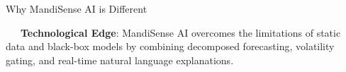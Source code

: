 \documentclass{beamer}
\begin{document}
\begin{frame}{Why MandiSense AI is Different}
\vspace{0.15cm}
\begin{tcolorbox}[enhanced, colback=primaryblue!4, colframe=primaryblue!30, boxrule=0.35pt,
  arc=3.5pt, width=0.98\textwidth, left=4pt, right=4pt, top=2.5pt, bottom=2.5pt, boxsep=0pt,
  halign=center, shadow={0.5pt}{-0.5pt}{0pt}{black!8}]
    \fontsize{5.5pt}{6.5pt}\selectfont
    \textcolor{primaryDark}{~~~\textbf{Technological Edge}: MandiSense AI overcomes the limitations of static data and black-box models by combining decomposed forecasting, volatility gating, and real-time natural language explanations.}
\end{tcolorbox}
\end{frame}

\end{document}
